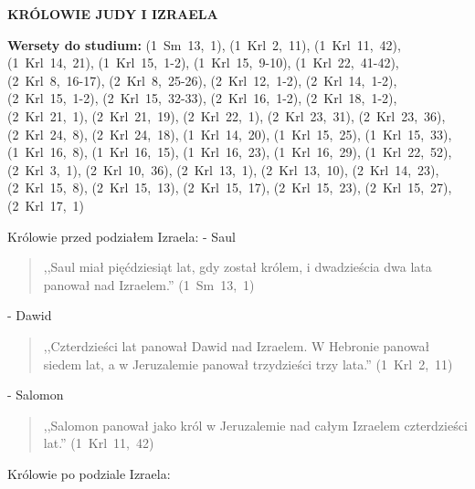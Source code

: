 \documentclass[10pt,a4paper,oneside]{article}
\begin{document}
\centerline{\textbf{\MakeUppercase{Królowie Judy i Izraela}}}
\begin{center}
\textbf{Wersety do studium:} (1~Sm~13,~1), (1~Krl~2,~11), (1~Krl~11,~42), (1~Krl~14,~21), (1~Krl~15,~1-2), (1~Krl~15,~9-10), (1~Krl~22,~41-42), (2~Krl~8,~16-17), (2~Krl~8,~25-26), (2~Krl~12,~1-2), (2~Krl~14,~1-2), (2~Krl~15,~1-2), (2~Krl~15,~32-33), (2~Krl~16,~1-2), (2~Krl~18,~1-2), (2~Krl~21,~1), (2~Krl~21,~19), (2~Krl~22,~1), (2~Krl~23,~31), (2~Krl~23,~36), (2~Krl~24,~8), (2~Krl~24,~18), (1~Krl~14,~20), (1~Krl~15,~25), (1~Krl~15,~33), (1~Krl~16,~8), (1~Krl~16,~15), (1~Krl~16,~23), (1~Krl~16,~29), (1~Krl~22,~52), (2~Krl~3,~1), (2~Krl~10,~36), (2~Krl~13,~1), (2~Krl~13,~10), (2~Krl~14,~23), (2~Krl~15,~8), (2~Krl~15,~13), (2~Krl~15,~17), (2~Krl~15,~23), (2~Krl~15,~27), (2~Krl~17,~1)
\end{center}
Królowie przed podziałem Izraela:
- Saul
\begin{quote}
,,Saul miał pięćdziesiąt lat, gdy został królem, i dwadzieścia dwa lata panował nad Izraelem.'' (1~Sm~13,~1)
\end{quote}
- Dawid
\begin{quote}
,,Czterdzieści lat panował Dawid nad Izraelem. W Hebronie panował siedem lat, a w Jeruzalemie panował trzydzieści trzy lata.'' (1~Krl~2,~11)
\end{quote}
- Salomon
\begin{quote}
,,Salomon panował jako król w Jeruzalemie nad całym Izraelem czterdzieści lat.'' (1~Krl~11,~42)
\end{quote}

Królowie po podziale Izraela:
\end{document}
